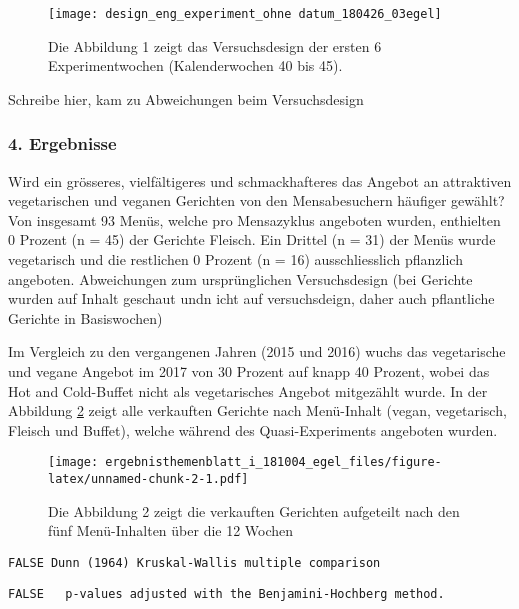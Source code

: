 \documentclass[12pt,ngerman,]{article}
\begin{document}
\begin{figure}[h]
\texttt{[image: design\_eng\_experiment\_ohne datum\_180426\_03egel]} \caption{\label{fig:fig1} Die Abbildung 1 zeigt das Versuchsdesign der ersten 6 Experimentwochen (Kalenderwochen 40 bis 45).}\label{fig:unnamed-chunk-1}
\end{figure}

Schreibe hier, kam zu Abweichungen beim Versuchsdesign

\hypertarget{ergebnisse}{%
\subsubsection{4. Ergebnisse}\label{ergebnisse}}

Wird ein grösseres, vielfältigeres und schmackhafteres das Angebot an
attraktiven vegetarischen und veganen Gerichten von den Mensabesuchern
häufiger gewählt? Von insgesamt 93 Menüs, welche pro Mensazyklus
angeboten wurden, enthielten 0 Prozent (n = 45) der Gerichte Fleisch.
Ein Drittel (n = 31) der Menüs wurde vegetarisch und die restlichen 0
Prozent (n = 16) ausschliesslich pflanzlich angeboten. Abweichungen zum
ursprünglichen Versuchsdesign (bei Gerichte wurden auf Inhalt geschaut
undn icht auf versuchsdeign, daher auch pflantliche Gerichte in
Basiswochen)

Im Vergleich zu den vergangenen Jahren (2015 und 2016) wuchs das
vegetarische und vegane Angebot im 2017 von 30 Prozent auf knapp 40
Prozent, wobei das Hot and Cold-Buffet nicht als vegetarisches Angebot
mitgezählt wurde. In der Abbildung \ref{fig:fig2} zeigt alle verkauften
Gerichte nach Menü-Inhalt (vegan, vegetarisch, Fleisch und Buffet),
welche während des Quasi-Experiments angeboten wurden.

\begin{figure}
\centering
\texttt{[image: ergebnisthemenblatt\_i\_181004\_egel\_files/figure-latex/unnamed-chunk-2-1.pdf]}
\caption{\label{fig:fig2} Die Abbildung 2 zeigt die verkauften Gerichten
aufgeteilt nach den fünf Menü-Inhalten über die 12 Wochen}
\end{figure}

\begin{verbatim}
FALSE Dunn (1964) Kruskal-Wallis multiple comparison
\end{verbatim}

\begin{verbatim}
FALSE   p-values adjusted with the Benjamini-Hochberg method.
\end{verbatim}
\end{document}
